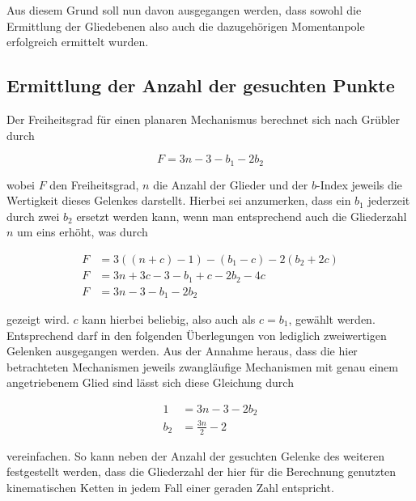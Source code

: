 Aus diesem Grund soll nun davon ausgegangen werden, dass sowohl die Ermittlung der Gliedebenen also auch die dazugehörigen Momentanpole erfolgreich ermittelt wurden.

\subsection{Ermittlung der Anzahl der gesuchten Punkte}

Der Freiheitsgrad für einen planaren Mechanismus berechnet sich nach Grübler durch

\begin{equation}
    F = 3n - 3 - b_1 - 2b_2
    \label{eq:gruebler}
\end{equation}

wobei $F$ den Freiheitsgrad, $n$ die Anzahl der Glieder und der $b$-Index jeweils die Wertigkeit dieses Gelenkes darstellt.
Hierbei sei anzumerken, dass ein $b_1$ jederzeit durch zwei $b_2$ ersetzt werden kann, wenn man entsprechend auch die Gliederzahl $n$ um eins erhöht, was durch

\begin{equation}
    \begin{split}
        F &= 3((n+c)-1) - (b_1 - c) - 2(b_2 + 2c) \\
        F &= 3n + 3c - 3 - b_1 + c - 2b_2 - 4c \\
        F &= 3n - 3 - b_1 - 2b_2
    \end{split}
\end{equation}

gezeigt wird.
$c$ kann hierbei beliebig, also auch als $c = b_1$, gewählt werden.
Entsprechend darf in den folgenden Überlegungen von lediglich zweiwertigen Gelenken ausgegangen werden.
Aus der Annahme heraus, dass die hier betrachteten Mechanismen jeweils zwangläufige Mechanismen mit genau einem angetriebenem Glied sind lässt sich diese Gleichung durch

\begin{equation}
    \begin{split}
        1 &= 3n - 3 - 2b_2 \\
        b_2 &= \frac{3n}{2} - 2
    \end{split}
\end{equation}

vereinfachen.
So kann neben der Anzahl der gesuchten Gelenke des weiteren festgestellt werden, dass die Gliederzahl der hier für die Berechnung genutzten kinematischen Ketten in jedem Fall einer geraden Zahl entspricht.


